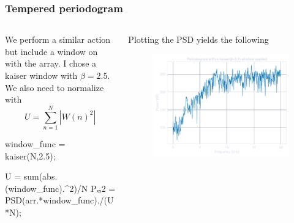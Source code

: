 \documentclass[compress]{beamer}
\begin{document}
\begin{frame}[fragile] %
    \frametitle{Tempered periodogram}
    \begin{columns}
        \begin{column}{0.5\textwidth}
            We perform a similar action but include a window on with the array.
            I chose a kaiser window with $\beta = 2.5$. \\
            We also need to normalize with 
            \begin{equation*}
                U = \sum^{N}_{n=1}{\left|W\left(n\right)^2\right|}
            \end{equation*}
            \begin{jllisting}[gobble=16]
                window_func = kaiser(N,2.5);

                U = sum(abs.(window_func).^2)/N
                Pₓₓ2 = PSD(arr.*window_func)./(U*N);
            \end{jllisting}
        \end{column}
        \begin{column}{0.5\textwidth}
            Plotting the PSD yields the following
            \begin{figure}
                \includegraphics[width=\columnwidth]{"../1b.pdf"}
            \end{figure}
        \end{column}
    \end{columns}
\end{frame}
\end{document}
